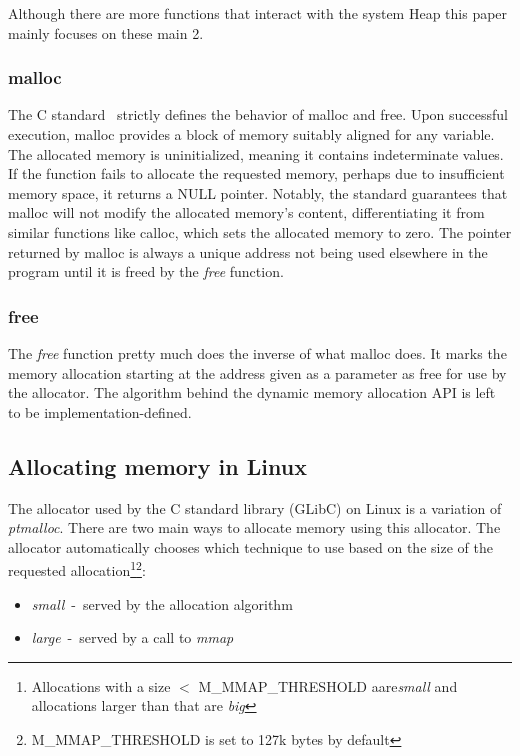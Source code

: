 \documentclass{article}
\begin{document}
Although there are more functions that interact with the system Heap this paper mainly focuses on these main 2.

\subsubsection{malloc}
The C standard~\cite[p.~154-157]{ANSI_C} strictly defines the behavior of malloc and free. Upon successful execution, malloc provides a block of memory suitably aligned for any variable. The allocated memory is uninitialized, meaning it contains indeterminate values. If the function fails to allocate the requested memory, perhaps due to insufficient memory space, it returns a NULL pointer. Notably, the standard guarantees that malloc will not modify the allocated memory's content, differentiating it from similar functions like calloc, which sets the allocated memory to zero. The pointer returned by malloc is always a unique address not being used elsewhere in the program until it is freed by the \emph{free} function.

\subsubsection{free}
The \emph{free} function pretty much does the inverse of what malloc does. It marks the memory allocation starting at the address given as a parameter as free for use by the allocator. The algorithm behind the dynamic memory allocation API is left to be implementation-defined.

\subsection{Allocating memory in Linux}
The allocator used by the C standard library (GLibC) on Linux is a variation of \emph{ptmalloc}. There are two main ways to allocate memory using this allocator. The allocator automatically chooses which technique to use based on the size of the requested allocation\footnote{Allocations with a size $<$ {M\_MMAP\_THRESHOLD} aare\emph{small} and allocations larger than that are \emph{big}}\footnote{{M\_MMAP\_THRESHOLD} is set to 127k bytes by default}:
\begin{itemize}
  \item \emph{small}~-~served by the allocation algorithm
  \item \emph{large}~-~served by a call to \emph{mmap}
\end{itemize}
\end{document}
